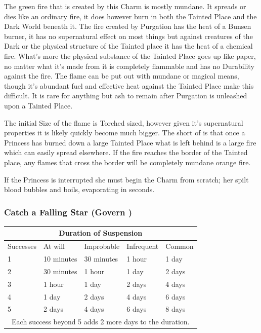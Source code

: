 The green fire that is created by this Charm is mostly mundane. It spreads or dies like an ordinary fire, it does however burn in both the Tainted Place and the Dark World beneath it. The fire created by Purgation has the heat of a Bunsen burner, it has no supernatural effect on most things but against creatures of the Dark or the physical structure of the Tainted place it has the heat of a chemical fire. What's more the physical substance of the Tainted Place goes up like paper, no matter what it's made from it is completely flammable and has no Durability against the fire. The flame can be put out with mundane or magical means, though it's abundant fuel and effective heat against the Tainted Place make this difficult. It is rare for anything but ash to remain after Purgation is unleashed upon a Tainted Place.

The initial Size of the flame is Torched sized, however given it's supernatural properties it is likely quickly become much bigger. The short of is that once a Princess has burned down a large Tainted Place what is left behind is a large fire which can easily spread elsewhere. If the fire reaches the border of the Tainted place, any flames that cross the border will be completely mundane orange fire.

If the Princess is interrupted she must begin the Charm from scratch; her spilt blood bubbles and boils, evaporating in seconds.


\subsubsection*{Catch a Falling Star (Govern \textbullet\textbullet\textbullet)}
\begin{table}[H]
    \begin{tabular}{|l|l|l|l|l|}
        \hline
        \multicolumn{5}{|c|}{Duration of Suspension}                                         \\ \hline
        Successes                                                & At will    & Improbable & Infrequent & Common  \\ \hline
        1                                                        & 10 minutes & 30 minutes & 1 hour     & 1 day   \\ \hline
        2                                                        & 30 minutes & 1 hour     & 1 day      & 2 days  \\ \hline
        3                                                        & 1 hour     & 1 day      & 2 days     & 4 days  \\ \hline
        4                                                        & 1 day      & 2 days     & 4 days     & 6 days  \\ \hline
        5                                                        & 2 days     & 4 days     & 6 days     & 8 days  \\ \hline
        \multicolumn{5}{|c|}{Each success beyond 5 adds 2 more days to the duration.}        \\
        \hline
    \end{tabular}
\end{table}

